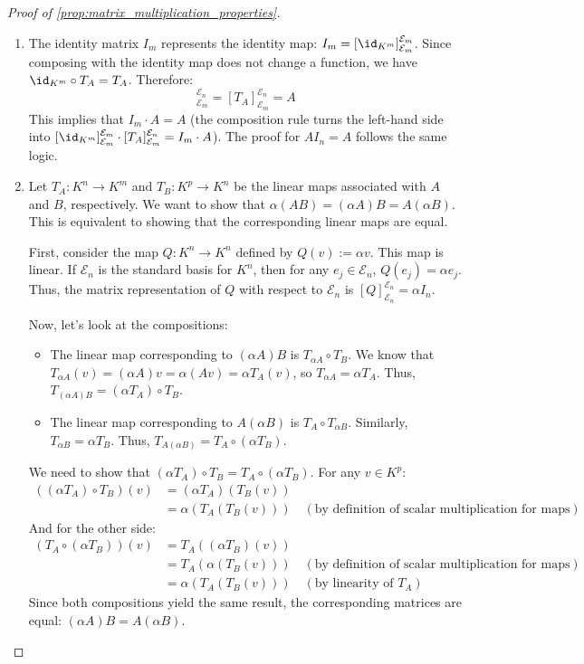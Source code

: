 \begin{proof}[Proof of \cref{prop:matrix_multiplication_properties}]
\begin{enumerate}[label=\textbf{(\alph*)}]
    \item The identity matrix $I_m$ represents the identity map: $I_m = [\id_{K^m}]_{\mathcal{E}_m}^{\mathcal{E}_m}$. Since composing with the identity map does not change a function, we have $\id_{K^m} \circ T_A = T_A$. Therefore:
    \begin{equation*}
        [\id_{K^m} \circ T_A]_{\mathcal{E}_m}^{\mathcal{E}_n} = [T_A]_{\mathcal{E}_m}^{\mathcal{E}_n} = A
    \end{equation*}
    This implies that $I_m \cdot A = A$ (the composition rule turns the left-hand side into $[\id_{K^m}]_{\mathcal{E}_m}^{\mathcal{E}_m} \cdot [T_A]_{\mathcal{E}_m}^{\mathcal{E}_n} = I_m \cdot A$). The proof for $A I_n = A$ follows the same logic.
    
    \item Let $T_A: K^n \to K^m$ and $T_B: K^p \to K^n$ be the linear maps associated with $A$ and $B$, respectively. We want to show that $\alpha(AB) = (\alpha A)B = A(\alpha B)$. This is equivalent to showing that the corresponding linear maps are equal.
    
    First, consider the map $Q: K^n \to K^n$ defined by $Q(v) := \alpha v$. This map is linear. If $\mathcal{E}_n$ is the standard basis for $K^n$, then for any $e_j \in \mathcal{E}_n$, $Q(e_j) = \alpha e_j$. Thus, the matrix representation of $Q$ with respect to $\mathcal{E}_n$ is $[Q]_{\mathcal{E}_n}^{\mathcal{E}_n} = \alpha I_n$.
    
    Now, let's look at the compositions:
    \begin{itemize}
        \item The linear map corresponding to $(\alpha A)B$ is $T_{\alpha A} \circ T_B$. We know that $T_{\alpha A}(v) = (\alpha A)v = \alpha(Av) = \alpha T_A(v)$, so $T_{\alpha A} = \alpha T_A$. Thus, $T_{(\alpha A)B} = (\alpha T_A) \circ T_B$.
        \item The linear map corresponding to $A(\alpha B)$ is $T_A \circ T_{\alpha B}$. Similarly, $T_{\alpha B} = \alpha T_B$. Thus, $T_{A(\alpha B)} = T_A \circ (\alpha T_B)$.
    \end{itemize}
    
    We need to show that $(\alpha T_A) \circ T_B = T_A \circ (\alpha T_B)$. For any $v \in K^p$:
    \begin{align*}
        ((\alpha T_A) \circ T_B)(v) &= (\alpha T_A)(T_B(v)) \\
        &= \alpha (T_A(T_B(v))) \quad (\text{by definition of scalar multiplication for maps})
    \end{align*}
    And for the other side:
    \begin{align*}
        (T_A \circ (\alpha T_B))(v) &= T_A((\alpha T_B)(v)) \\
        &= T_A(\alpha (T_B(v))) \quad (\text{by definition of scalar multiplication for maps}) \\
        &= \alpha (T_A(T_B(v))) \quad (\text{by linearity of } T_A)
    \end{align*}
    Since both compositions yield the same result, the corresponding matrices are equal: $(\alpha A)B = A(\alpha B)$.
    

\end{enumerate}
\end{proof}
